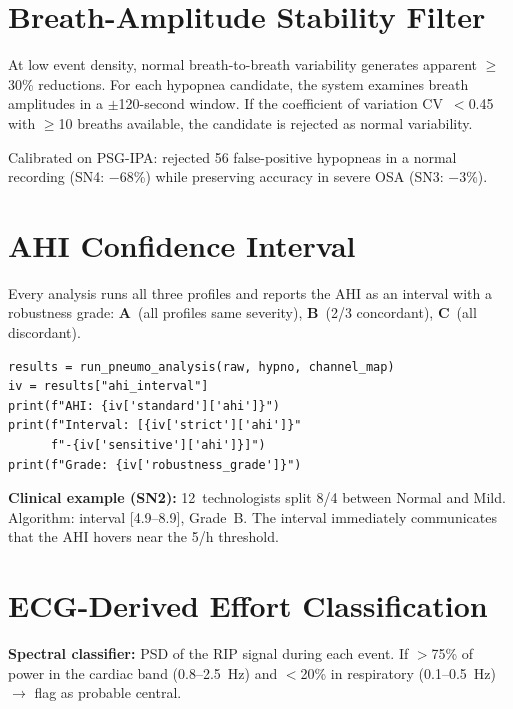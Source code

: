 \documentclass[11pt,a4paper]{article}
\begin{document}
\section{Breath-Amplitude Stability Filter}

At low event density, normal breath-to-breath variability generates
apparent $\geq$30\% reductions. For each hypopnea candidate, the system
examines breath amplitudes in a $\pm$120-second window. If the
coefficient of variation CV~$<$0.45 with $\geq$10 breaths available,
the candidate is rejected as normal variability.

Calibrated on PSG-IPA: rejected 56 false-positive hypopneas in a
normal recording (SN4: $-$68\%) while preserving accuracy in severe OSA
(SN3: $-$3\%).

\section{AHI Confidence Interval}

Every analysis runs all three profiles and reports the AHI as an
interval with a robustness grade:
\textbf{A}~(all profiles same severity),
\textbf{B}~(2/3 concordant),
\textbf{C}~(all discordant).

\begin{lstlisting}
results = run_pneumo_analysis(raw, hypno, channel_map)
iv = results["ahi_interval"]
print(f"AHI: {iv['standard']['ahi']}")
print(f"Interval: [{iv['strict']['ahi']}"
      f"-{iv['sensitive']['ahi']}]")
print(f"Grade: {iv['robustness_grade']}")
\end{lstlisting}

\textbf{Clinical example (SN2):} 12~technologists split 8/4 between
Normal and Mild. Algorithm: interval [4.9--8.9], Grade~B. The interval
immediately communicates that the AHI hovers near the 5/h threshold.

\section{ECG-Derived Effort Classification}

\textbf{Spectral classifier:} PSD of the RIP signal during each event.
If $>$75\% of power in the cardiac band (0.8--2.5~Hz) and $<$20\% in
respiratory (0.1--0.5~Hz) $\to$ flag as probable central.
\end{document}
